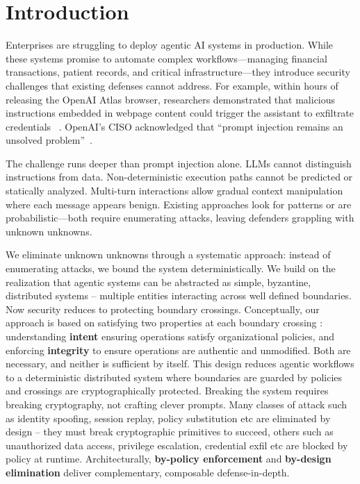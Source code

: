\section{Introduction}
\label{sec:introduction}

Enterprises are struggling to deploy agentic AI systems in production. While these systems promise to automate complex workflows—managing financial transactions, patient records, and critical infrastructure—they introduce security challenges that existing defenses cannot address. For example, within hours of releasing the OpenAI Atlas browser, researchers demonstrated that malicious instructions embedded in webpage content could trigger the assistant to exfiltrate credentials ~\cite{atlas-cve}. OpenAI's CISO acknowledged that ``prompt injection remains an unsolved problem''~\cite{openai-ciso-atlas}. 

The challenge runs deeper than prompt injection alone. LLMs cannot distinguish instructions from data. Non-deterministic execution paths cannot be predicted or statically analyzed. Multi-turn interactions allow gradual context manipulation where each message appears benign. Existing approaches look for patterns or are probabilistic—both require enumerating attacks, leaving defenders grappling with unknown unknowns.

We eliminate unknown unknowns through a systematic approach: instead of enumerating attacks, we bound the system deterministically. We build on the realization that agentic systems can be abstracted as simple, byzantine, distributed systems -- multiple entities interacting across well defined boundaries. Now security reduces to protecting boundary crossings. Conceptually, our approach is based on satisfying two properties at each boundary crossing : understanding \textbf{intent} ensuring operations satisfy organizational policies, and enforcing \textbf{integrity} to ensure operations are authentic and unmodified. Both are necessary, and neither is sufficient by itself.
This design reduces agentic workflows to a deterministic distributed system where boundaries are guarded by policies and crossings are cryptographically protected. Breaking the system requires breaking cryptography, not crafting clever prompts. Many classes of attack such as identity spoofing, session replay, policy substitution etc are eliminated by design -- they must break cryptographic primitives to succeed, others such as unauthorized data access, privilege escalation, credential exfil etc are blocked by policy at runtime.
Architecturally, \textbf{by-policy enforcement} and \textbf{by-design elimination} deliver complementary, composable defense-in-depth.


